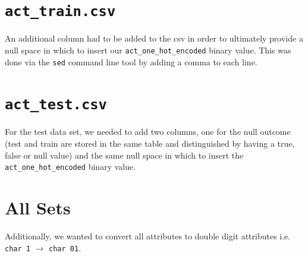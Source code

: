 \documentclass[]{report}
\newenvironment{Shaded}{}{}
\newcommand{\KeywordTok}[1]{\textcolor[rgb]{0.00,0.44,0.13}{\textbf{{#1}}}}
\newcommand{\StringTok}[1]{\textcolor[rgb]{0.25,0.44,0.63}{{#1}}}
\newcommand{\NormalTok}[1]{{#1}}
\begin{document}
\section{\texorpdfstring{\texttt{act\_train.csv}}{act\_train.csv}}\label{act_train.csv}

An additional column had to be added to the csv in order to ultimately
provide a null space in which to insert our
\texttt{act\_one\_hot\_encoded} binary value. This was done via the
\texttt{sed} command line tool by adding a comma to each line.

\begin{Shaded}
\end{Shaded}

\section{\texorpdfstring{\texttt{act\_test.csv}}{act\_test.csv}}\label{act_test.csv}

For the test data set, we needed to add two columns, one for the null
outcome (test and train are stored in the same table and distinguished
by having a true, false or null value) and the same null space in which
to insert the \texttt{act\_one\_hot\_encoded} binary value.

\begin{Shaded}
\end{Shaded}

\section{All Sets}\label{all-sets}

Additionally, we wanted to convert all attributes to double digit
attributes i.e. \texttt{char\ 1} \(\to\) \texttt{char\ 01}.

\begin{Shaded}
\end{Shaded}
\end{document}
